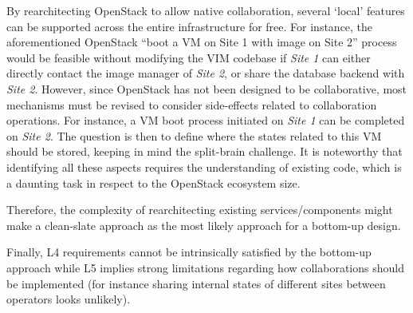 By rearchitecting OpenStack to allow native
collaboration, several `local' features can be supported across the entire
\edge infrastructure for free. For instance, the aforementioned
OpenStack ``boot a VM on Site 1 with image on Site 2'' process would
be feasible without modifying the VIM codebase if \emph{Site 1} can
either directly contact the image manager of \emph{Site 2}, or share
the database backend with \emph{Site 2}.
However, since OpenStack has not been designed to be collaborative, most
mechanisms must be revised to consider side-effects related to
collaboration operations.
%
For instance, a VM boot process initiated on \emph{Site 1} can be
completed on \emph{Site 2}. The question is then to define where the states
related to this VM should be stored, keeping in mind the split-brain
challenge.
%
It is noteworthy that identifying all these aspects requires the understanding of
existing code, which is a daunting task in respect to the OpenStack
ecosystem size.
% 

Therefore, the complexity of rearchitecting existing services/components might make a clean-slate approach as the most likely approach for a bottom-up design.

Finally, L4 requirements cannot be intrinsically satisfied by the
bottom-up approach while L5 implies strong limitations regarding how
collaborations should be implemented (for instance sharing internal
states of different \edge sites between operators looks unlikely).

%



